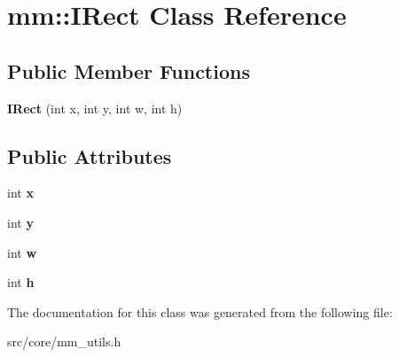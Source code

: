 \hypertarget{classmm_1_1_i_rect}{}\section{mm\+:\+:I\+Rect Class Reference}
\label{classmm_1_1_i_rect}
\subsection*{Public Member Functions}
\begin{DoxyCompactItemize}
\item 
\hypertarget{classmm_1_1_i_rect_ac75013bbed3fe8e6dec3b8bbc6e23f30}{}{\bfseries I\+Rect} (int x, int y, int w, int h)\label{classmm_1_1_i_rect_ac75013bbed3fe8e6dec3b8bbc6e23f30}

\end{DoxyCompactItemize}
\subsection*{Public Attributes}
\begin{DoxyCompactItemize}
\item 
\hypertarget{classmm_1_1_i_rect_a11dd5b0a710f2e9d38867d4831a6a4d0}{}int {\bfseries x}\label{classmm_1_1_i_rect_a11dd5b0a710f2e9d38867d4831a6a4d0}

\item 
\hypertarget{classmm_1_1_i_rect_a1c8d2b62e7105b1ec63e44cbcb472f2f}{}int {\bfseries y}\label{classmm_1_1_i_rect_a1c8d2b62e7105b1ec63e44cbcb472f2f}

\item 
\hypertarget{classmm_1_1_i_rect_ab151e39613a7f4c830c086ee6f11f38d}{}int {\bfseries w}\label{classmm_1_1_i_rect_ab151e39613a7f4c830c086ee6f11f38d}

\item 
\hypertarget{classmm_1_1_i_rect_a33768c8133beb1d17e14e60a76e49635}{}int {\bfseries h}\label{classmm_1_1_i_rect_a33768c8133beb1d17e14e60a76e49635}

\end{DoxyCompactItemize}


The documentation for this class was generated from the following file\+:\begin{DoxyCompactItemize}
\item 
src/core/mm\+\_\+utils.\+h\end{DoxyCompactItemize}
